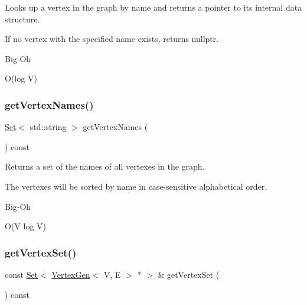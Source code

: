 Looks up a vertex in the graph by name and returns a pointer to its internal data structure. 

If no vertex with the specified name exists, returns nullptr. \begin{DoxyRefDesc}{Big-\/\+Oh}
\item[\mbox{\hyperlink{BigOh__BigOh000026}{Big-\/\+Oh}}]O(log V) \end{DoxyRefDesc}
\mbox{\label{classBasicGraphGen_ae1bca1f87888bd787f836bc064a9ff01}} 
\subsubsection{\texorpdfstring{get\+Vertex\+Names()}{getVertexNames()}}
{\footnotesize\ttfamily \mbox{\hyperlink{classSet}{Set}}$<$ std\+::string $>$ get\+Vertex\+Names (\begin{DoxyParamCaption}{ }\end{DoxyParamCaption}) const}



Returns a set of the names of all vertexes in the graph. 

The vertexes will be sorted by name in case-\/sensitive alphabetical order. \begin{DoxyRefDesc}{Big-\/\+Oh}
\item[\mbox{\hyperlink{BigOh__BigOh000027}{Big-\/\+Oh}}]O(\+V log V) \end{DoxyRefDesc}
\mbox{\label{classBasicGraphGen_aec896ef5b1fc6044fc71318d1369f6f1}} 
\subsubsection{\texorpdfstring{get\+Vertex\+Set()}{getVertexSet()}}
{\footnotesize\ttfamily const \mbox{\hyperlink{classSet}{Set}}$<$ \mbox{\hyperlink{classVertexGen}{Vertex\+Gen}}$<$ V, E $>$ $\ast$ $>$ \& get\+Vertex\+Set (\begin{DoxyParamCaption}{ }\end{DoxyParamCaption}) const}



